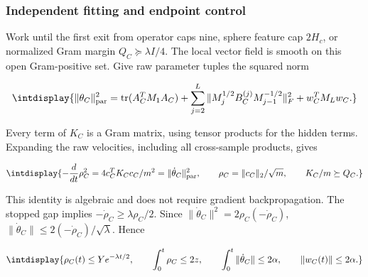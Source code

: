 \subsubsection{Independent fitting and endpoint control}
\label{int:compact-fitting-proof}
\label{int:harmonic-fitting-proof}


Work until the first exit from operator caps nine, sphere feature cap \(2H_c\), or normalized Gram margin \(Q_C\succeq\lambda I/4\). The local vector field is smooth on this open Gram-positive set. Give raw parameter tuples the squared norm


\begingroup\renewcommand{\theHequation}{intdisplay.572}
\begin{equation*}
\intdisplay{
\|\theta_C\|_{\rm par}^2=
 \operatorname{tr}(A_C^TM_1A_C)
 +\sum_{j=2}^L\|M_j^{1/2}B_C^{(j)}M_{j-1}^{-1/2}\|_F^2
 +w_C^TM_Lw_C.
}
\end{equation*}
\endgroup


Every term of \(K_C\) is a Gram matrix, using tensor products for the hidden terms. Expanding the raw velocities, including all cross-sample products, gives


\begingroup\renewcommand{\theHequation}{intdisplay.573}
\begin{equation}
\intdisplay{
-\frac d{dt}\rho_C^2=4c_C^TK_Cc_C/m^2
       =\|\dot\theta_C\|_{\rm par}^2,
\qquad \rho_C=\|c_C\|_2/\sqrt m,
\qquad K_C/m\succeq Q_C.
}
\label{int:eq-0237-harmonic-exact-energy-identity}
\end{equation}
\endgroup


This identity is algebraic and does not require gradient backpropagation. The stopped gap implies \(-\dot\rho_C\ge\lambda\rho_C/2\). Since \(\|\dot\theta_C\|^2=2\rho_C(-\dot\rho_C)\), \(\|\dot\theta_C\|\le2(-\dot\rho_C)/\sqrt\lambda\). Hence


\begingroup\renewcommand{\theHequation}{intdisplay.574}
\begin{equation}
\intdisplay{
\rho_C(t)\le Ye^{-\lambda t/2},\qquad
\int_0^t\rho_C\le2z,\qquad
\int_0^t\|\dot\theta_C\|\le2\alpha,\qquad
\|w_C(t)\|\le2\alpha.
}
\label{int:eq-0238-harmonic-fitting-energy-bounds}
\end{equation}
\endgroup

